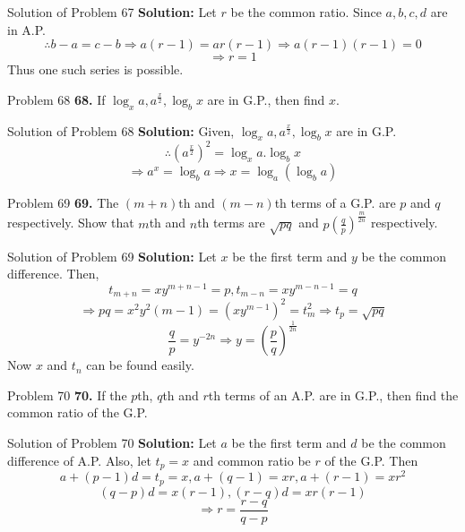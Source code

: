 \documentclass[aspectratio=1610,8pt]{beamer}
\begin{document}
\begin{frame}{Solution of Problem 67}
  \textbf{Solution:} Let $r$ be the common ratio. Since $a, b, c, d$ are in A.P.
  $$\therefore b - a = c - b \Rightarrow a(r - 1) = ar(r - 1) \Rightarrow a(r - 1)(r - 1) = 0$$
  $$\Rightarrow r = 1$$
  Thus one such series is possible.
\end{frame}
\begin{frame}{Problem 68}
  \textbf{68.} If $\log_x a, a^{\frac{x}{2}}, \log_b x$ are in G.P., then find $x.$
\end{frame}
\begin{frame}{Solution of Problem 68}
  \textbf{Solution:} Given, $\log_x a, a^{\frac{x}{2}}, \log_b x$ are in G.P.
  $$\therefore \left(a^{\frac{x}{2}}\right)^2 = \log_x a. \log_b x$$
  $$\Rightarrow a^x = \log_b a \Rightarrow x = \log_a(\log_b a)$$
\end{frame}
\begin{frame}{Problem 69}
  \textbf{69.} The $(m + n)$th and $(m - n)$th terms of a G.P. are $p$ and $q$ respectively. Show that $m$th and $n$th terms are
  $\sqrt{pq}$ and $p\left(\frac{q}{p}\right)^\frac{m}{2n}$ respectively.
\end{frame}
\begin{frame}{Solution of Problem 69}
  \textbf{Solution:} Let $x$ be the first term and $y$ be the common difference. Then,
  $$t_{m + n} = xy^{m + n - 1} = p, t_{m - n} = xy^{m - n - 1} = q$$
  $$\Rightarrow pq = x^2y^2(m - 1) = (xy^{m - 1})^2 = t_{m}^2\Rightarrow t_p = \sqrt{pq}$$
  $$\frac{q}{p} = y^{-2n}\Rightarrow y = \left(\frac{p}{q}\right)^{\frac{1}{2n}}$$
  Now $x$ and $t_n$ can be found easily.
\end{frame}
\begin{frame}{Problem 70}
  \textbf{70.} If the $p$th, $q$th and $r$th terms of an A.P. are in G.P., then find the common ratio of the G.P.
\end{frame}
\begin{frame}{Solution of Problem 70}
  \textbf{Solution:} Let $a$ be the first term and $d$ be the common difference of A.P. Also, let $t_p = x$ and common ratio be $r$
  of the G.P. Then
  $$a + (p - 1)d = t_p = x, a + (q - 1) = xr, a + (r - 1) = xr^2$$
  $$(q - p)d = x(r - 1), (r - q)d = xr(r - 1)$$
  $$\Rightarrow r = \frac{r - q}{q - p}$$
\end{frame}
\end{document}
